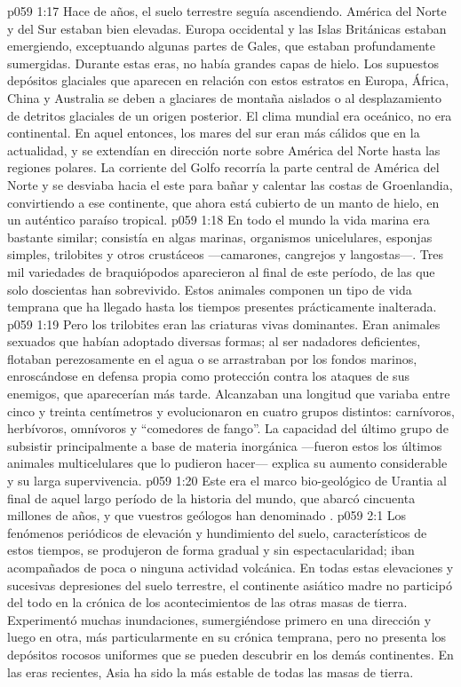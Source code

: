 \vs p059 1:17 \pc Hace  de años, el suelo terrestre seguía ascendiendo. América del Norte y del Sur estaban bien elevadas. Europa occidental y las Islas Británicas estaban emergiendo, exceptuando algunas partes de Gales, que estaban profundamente sumergidas. Durante estas eras, no había grandes capas de hielo. Los supuestos depósitos glaciales que aparecen en relación con estos estratos en Europa, África, China y Australia se deben a glaciares de montaña aislados o al desplazamiento de detritos glaciales de un origen posterior. El clima mundial era oceánico, no era continental. En aquel entonces, los mares del sur eran más cálidos que en la actualidad, y se extendían en dirección norte sobre América del Norte hasta las regiones polares. La corriente del Golfo recorría la parte central de América del Norte y se desviaba hacia el este para bañar y calentar las costas de Groenlandia, convirtiendo a ese continente, que ahora está cubierto de un manto de hielo, en un auténtico paraíso tropical.
\vs p059 1:18 \pc En todo el mundo la vida marina era bastante similar; consistía en algas marinas, organismos unicelulares, esponjas simples, trilobites y otros crustáceos ---camarones, cangrejos y langostas---. Tres mil variedades de braquiópodos aparecieron al final de este período, de las que solo doscientas han sobrevivido. Estos animales componen un tipo de vida temprana que ha llegado hasta los tiempos presentes prácticamente inalterada.
\vs p059 1:19 Pero los trilobites eran las criaturas vivas dominantes. Eran animales sexuados que habían adoptado diversas formas; al ser nadadores deficientes, flotaban perezosamente en el agua o se arrastraban por los fondos marinos, enroscándose en defensa propia como protección contra los ataques de sus enemigos, que aparecerían más tarde. Alcanzaban una longitud que variaba entre cinco y treinta centímetros y evolucionaron en cuatro grupos distintos: carnívoros, herbívoros, omnívoros y “comedores de fango”. La capacidad del último grupo de subsistir principalmente a base de materia inorgánica ---fueron estos los últimos animales multicelulares que lo pudieron hacer--- explica su aumento considerable y su larga supervivencia.
\vs p059 1:20 Este era el marco bio\hyp{}geológico de Urantia al final de aquel largo período de la historia del mundo, que abarcó cincuenta millones de años, y que vuestros geólogos han denominado .
\vs p059 2:1 Los fenómenos periódicos de elevación y hundimiento del suelo, característicos de estos tiempos, se produjeron de forma gradual y sin espectacularidad; iban acompañados de poca o ninguna actividad volcánica. En todas estas elevaciones y sucesivas depresiones del suelo terrestre, el continente asiático madre no participó del todo en la crónica de los acontecimientos de las otras masas de tierra. Experimentó muchas inundaciones, sumergiéndose primero en una dirección y luego en otra, más particularmente en su crónica temprana, pero no presenta los depósitos rocosos uniformes que se pueden descubrir en los demás continentes. En las eras recientes, Asia ha sido la más estable de todas las masas de tierra.
